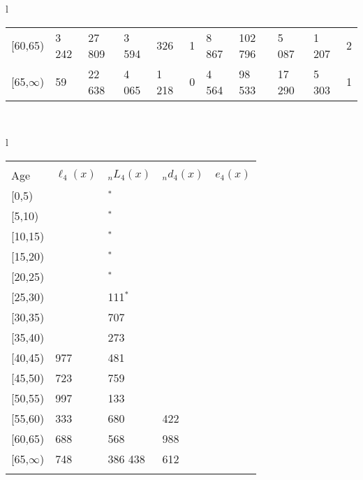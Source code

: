 \documentclass[
]{article}
\begin{document}
\begin{table}
\begin{tabular}[t]{l}
\begin{tabular}
{}[60,65) & 3 242 & 27 809 & 3 594 & 326 & 1 & 8 867 & 102 796 & 5 087 & 1 207 & 2\\
{}[65,$\infty$) & 59 & 22 638 & 4 065 & 1 218 & 0 & 4 564 & 98 533 & 17 290 & 5 303 & 1\\
\end{tabular}\\
\end{tabular}
\centering
\begin{tabular}[t]{l}
\hline
\begin{tabular}{>{\raggedright\arraybackslash}p{.43in}>{\raggedleft\arraybackslash}p{1.3in}>{\raggedleft\arraybackslash}p{1.3in}>{\raggedleft\arraybackslash}p{1.3in}>{\raggedleft\arraybackslash}p{1.3in}}
\toprule
\multicolumn{1}{c}{ } & \multicolumn{4}{c}{(4) Lost both} \\
\cmidrule(l{3pt}r{3pt}){2-5}
Age & $\ell_{4}(x)$ & ${}_nL_{4}(x)$ & ${}_nd_{4}(x)$ & $e_{4}(x)$\\
\midrule
{}[0,5) & 0 & 0$^{*}$ & 0 & 20\\
{}[5,10) & 0 & 0$^{*}$ & 0 & 20\\
{}[10,15) & 0 & 199$^{*}$ & 0 & 20\\
{}[15,20) & 199 & 519$^{*}$ & 0 & 20\\
{}[20,25) & 199 & 966$^{*}$ & 1 & 20\\
\addlinespace
{}[25,30) & 198 & 1 111$^{*}$ & 1 & 20\\
{}[30,35) & 491 & 4 707 & 8 & 20\\
{}[35,40) & 929 & 7 273 & 16 & 20\\
{}[40,45) & 1 977 & 16 481 & 45 & 21\\
{}[45,50) & 2 723 & 45 759 & 170 & 21\\
\addlinespace
{}[50,55) & 7 997 & 99 133 & 535 & 21\\
{}[55,60) & 15 333 & 175 680 & 1 422 & 20\\
{}[60,65) & 24 688 & 254 568 & 2 988 & 19\\
{}[65,$\infty$) & 30 748 & 1 386 438 & 74 612 & 17\\
\bottomrule
\multicolumn{5}{l}{\rule{0pt}{1em}\textsuperscript{*} Based on an estimated from SIPP with less than 10 respondents in the numerator.}\\
\end{tabular}\\
\end{tabular}
\end{table}
\end{document}
